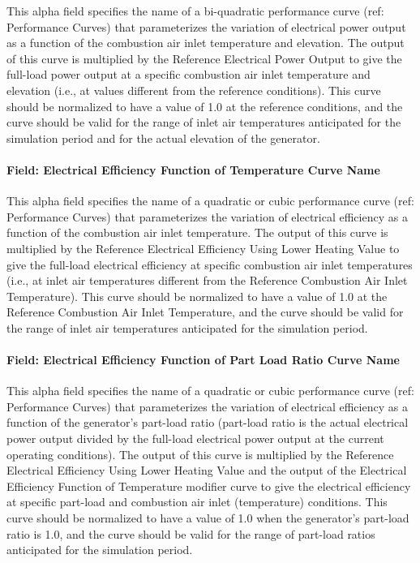This alpha field specifies the name of a bi-quadratic performance curve (ref: Performance Curves) that parameterizes the variation of electrical power output as a function of the combustion air inlet temperature and elevation. The output of this curve is multiplied by the Reference Electrical Power Output to give the full-load power output at a specific combustion air inlet temperature and elevation (i.e., at values different from the reference conditions). This curve should be normalized to have a value of 1.0 at the reference conditions, and the curve should be valid for the range of inlet air temperatures anticipated for the simulation period and for the actual elevation of the generator.

\paragraph{Field: Electrical Efficiency Function of Temperature Curve Name}\label{field-electrical-efficiency-function-of-temperature-curve-name}

This alpha field specifies the name of a quadratic or cubic performance curve (ref: Performance Curves) that parameterizes the variation of electrical efficiency as a function of the combustion air inlet temperature. The output of this curve is multiplied by the Reference Electrical Efficiency Using Lower Heating Value to give the full-load electrical efficiency at specific combustion air inlet temperatures (i.e., at inlet air temperatures different from the Reference Combustion Air Inlet Temperature). This curve should be normalized to have a value of 1.0 at the Reference Combustion Air Inlet Temperature, and the curve should be valid for the range of inlet air temperatures anticipated for the simulation period.

\paragraph{Field: Electrical Efficiency Function of Part Load Ratio Curve Name}\label{field-electrical-efficiency-function-of-part-load-ratio-curve-name}

This alpha field specifies the name of a quadratic or cubic performance curve (ref: Performance Curves) that parameterizes the variation of electrical efficiency as a function of the generator's part-load ratio (part-load ratio is the actual electrical power output divided by the full-load electrical power output at the current operating conditions). The output of this curve is multiplied by the Reference Electrical Efficiency Using Lower Heating Value and the output of the Electrical Efficiency Function of Temperature modifier curve to give the electrical efficiency at specific part-load and combustion air inlet (temperature) conditions. This curve should be normalized to have a value of 1.0 when the generator's part-load ratio is 1.0, and the curve should be valid for the range of part-load ratios anticipated for the simulation period.

